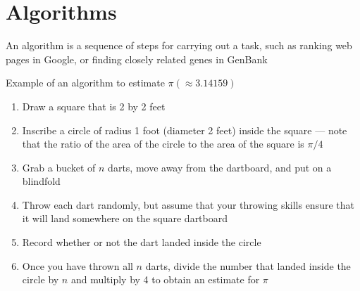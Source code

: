 \documentclass[8pt,a4paper,compress]{beamer}
\begin{document}
\section{Algorithms}
\begin{frame}[fragile]
\pause

An algorithm is a sequence of steps for carrying out a task, such as ranking web pages in Google, or finding closely related genes in GenBank

\pause
\bigskip


\begin{minipage}{200pt}
Example of an algorithm to estimate $\pi (\approx 3.14159)$

\begin{enumerate}
\item Draw a square that is 2 by 2 feet
\item Inscribe a circle of radius 1 foot (diameter 2 feet) inside the square --- note that the ratio of the area of the circle to the area of the square is $\pi/4$
\item Grab a bucket of $n$ darts, move away from the dartboard, and put on a blindfold
\item Throw each dart randomly, but assume that your throwing skills ensure that it will land somewhere on the square dartboard
\item Record whether or not the dart landed inside the circle
\item Once you have thrown all $n$ darts, divide the number that landed inside the circle by $n$ and multiply by 4 to obtain an estimate for $\pi$
\end{enumerate}
\end{minipage}%
\hfill
\begin{minipage}{100pt}
\begin{center}
\end{center}
\end{minipage}
\end{frame}
\end{document}
